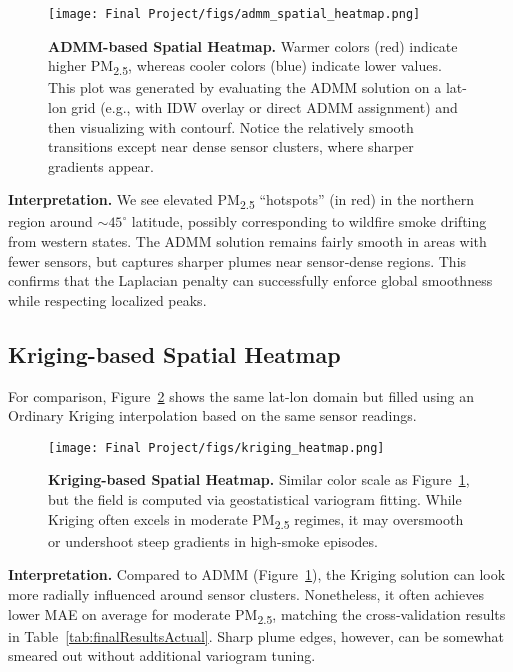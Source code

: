 \documentclass[12pt]{article}                                %
\begin{document}
\begin{figure}[H]  %
    \centering
    \texttt{[image: Final Project/figs/admm\_spatial\_heatmap.png]}
    \caption{\textbf{ADMM-based Spatial Heatmap.}
    Warmer colors (red) indicate higher PM\textsubscript{2.5}, whereas cooler colors (blue) indicate lower values. This plot was generated by evaluating the ADMM solution on a lat-lon grid (e.g., with IDW overlay or direct ADMM assignment) and then visualizing with contourf. 
    Notice the relatively smooth transitions except near dense sensor clusters, where sharper gradients appear.}
    \label{fig:admmHeatmap}
\end{figure}

\noindent
\textbf{Interpretation.}
We see elevated PM\textsubscript{2.5} “hotspots” (in red) in the northern region around \(\sim 45^\circ\) latitude, possibly corresponding to wildfire smoke drifting from western states. The ADMM solution remains fairly smooth in areas with fewer sensors, but captures sharper plumes near sensor‐dense regions. This confirms that the Laplacian penalty can successfully enforce global smoothness while respecting localized peaks.

\subsection{Kriging-based Spatial Heatmap}

For comparison, Figure~\ref{fig:krigHeatmap} shows the same lat-lon domain but filled using an Ordinary Kriging interpolation based on the same sensor readings.

\begin{figure}[H]  %
    \centering
    \texttt{[image: Final Project/figs/kriging\_heatmap.png]}
    \caption{\textbf{Kriging-based Spatial Heatmap.}
    Similar color scale as Figure~\ref{fig:admmHeatmap}, but the field is computed via geostatistical variogram fitting. 
    While Kriging often excels in moderate PM\textsubscript{2.5} regimes, it may oversmooth or undershoot steep gradients in high-smoke episodes.}
    \label{fig:krigHeatmap}
\end{figure}

\noindent
\textbf{Interpretation.}
Compared to ADMM (Figure~\ref{fig:admmHeatmap}), the Kriging solution can look more radially influenced around sensor clusters. Nonetheless, it often achieves lower MAE on average for moderate PM\textsubscript{2.5}, matching the cross‐validation results in Table~\ref{tab:finalResultsActual}. 
Sharp plume edges, however, can be somewhat smeared out without additional variogram tuning.
\end{document}
